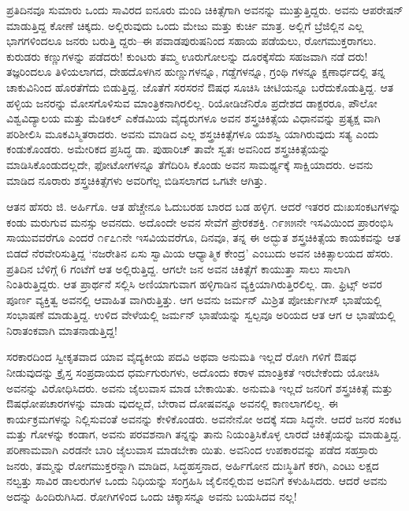 ಪ್ರತಿದಿನವೂ ಸುಮಾರು ಒಂದು ಸಾವಿರದ ಐನೂರು ಮಂದಿ ಚಿಕಿತ್ಸೆಗಾಗಿ ಅವನನ್ನು ಮುತ್ತುತ್ತಿದ್ದರು. ಅವನು ಆಪರೇಷನ್ ಮಾಡುತ್ತಿದ್ದ ಕೋಣೆ ಚಿಕ್ಕದು. ಅಲ್ಲಿರುವುದು ಒಂದು ಮೇಜು ಮತ್ತು ಕುರ್ಚಿ ಮಾತ್ರ. ಅಲ್ಲಿಗೆ ಬ್ರೆಜಿಲ್ಲಿನ ಎಲ್ಲ ಭಾಗಗಳಿಂದಲೂ ಜನರು ಬರುತ್ತಿ ದ್ದರು–ಈ ಪವಾಡಪುರುಷನಿಂದ ಸಹಾಯ ಪಡೆಯಲು, ರೋಗಮುಕ್ತರಾಗಲು. ಕುರುಡರು ಕಣ್ಣುಗಳನ್ನು ಪಡೆದರು! ಕುಂಟರು ತಮ್ಮ ಊರುಗೋಲನ್ನು ದೂರಕ್ಕೆಸೆದು ಸಹಜವಾಗಿ ನಡೆ ದರು! ತಜ್ಞರಿಂದಲೂ ತಿಳಿಯಲಾಗದ, ದೇಹದೊಳಗಿನ ಹುಣ್ಣುಗಳನ್ನೂ, ಗಡ್ಡೆಗಳನ್ನೂ, ಗ್ರಂಥಿ ಗಳನ್ನೂ ಕ್ಷಣಾರ್ಧದಲ್ಲಿ ತನ್ನ ಚಾಕುವಿನಿಂದ ಹೊರತೆಗೆದು ಬಿಡುತ್ತಿದ್ದ. ಜೊತೆಗೆ ಸರಸರನೆ ಔಷಧ ಸೂಚಿಸಿ ಚೀಟಿಯನ್ನೂ ಬರೆದುಕೊಡುತ್ತಿದ್ದ. ಆತ ಹಳ್ಳಿಯ ಜನರನ್ನು ಮೋಸಗೊಳಿಸುವ ಮಾಂತ್ರಿಕನಾಗಿರಲಿಲ್ಲ. ರಿಯೋಡಿಜೆನಿರೊ ಪ್ರದೇಶದ ಡಾಕ್ಟರರೂ, ಪೌಲೋ ವಿಶ್ವವಿದ್ಯಾಲಯ ಮತ್ತು ಮೆಡಿಕಲ್ ಎಕೆಡಮಿಯ ವೈದ್ಯರುಗಳೂ ಅವನ ಶಸ್ತ್ರಚಿಕಿತ್ಸೆಯ ವಿಧಾನವನ್ನು ಪ್ರತ್ಯಕ್ಷ ವಾಗಿ ಪರಿಶೀಲಿಸಿ ಮೂಕವಿಸ್ಮಿತರಾದರು. ಅವನು ಮಾಡಿದ ಎಲ್ಲ ಶಸ್ತ್ರಚಿಕಿತ್ಸೆಗಳೂ ಯಶಸ್ವಿ ಯಾಗಿರುವುದು ಸತ್ಯ ಎಂದು ಕಂಡುಕೊಂಡರು. ಅಮೇರಿಕದ ಪ್ರಸಿದ್ಧ ಡಾ. ಪುಹಾರಿಚ್ ತಾವೇ ಸ್ವತಃ ಅವನಿಂದ ಶಸ್ತ್ರಚಿಕಿತ್ಸೆಯನ್ನು ಮಾಡಿಸಿಕೊಂಡುದಲ್ಲದೇ, ಫೋಟೋಗಳನ್ನೂ ತೆಗೆದಿರಿಸಿ ಕೊಂಡು ಅವನ ಸಾಮರ್ಥ್ಯಕ್ಕೆ ಸಾಕ್ಷಿಯಾದರು. ಅವನು ಮಾಡಿದ ನೂರಾರು ಶಸ್ತ್ರಚಿಕಿತ್ಸೆಗಳು ಅವರಿಗೆಲ್ಲ ಬಿಡಿಸಲಾಗದ ಒಗಟೇ ಆಗಿತ್ತು.

ಆತನ ಹೆಸರು ಜಿ. ಅರ್ಹಿಗೊ. ಆತ ಹೆಚ್ಚೇನೂ ಓದುಬರಹ ಬಾರದ ಬಡ ಹಳ್ಳಿಗ. ಆದರೆ ಇತರರ ದುಃಖಸಂಕಟಗಳನ್ನು ಕಂಡು ಮರುಗುವ ಮನಸ್ಸು ಅವನದು. ಅದೊಂದೇ ಅವನ ಸೇವೆಗೆ ಪ್ರೇರಕಶಕ್ತಿ. ೧೯೫೫ನೇ ಇಸವಿಯಿಂದ ಪ್ರಾರಂಭಿಸಿ ಸಾಯುವವರೆಗೂ ಎಂದರೆ ೧೯೭೧ನೇ ಇಸವಿಯವರೆಗೂ, ದಿನವೂ, ತನ್ನ ಈ ಅದ್ಭುತ ಶಸ್ತ್ರಚಿಕಿತ್ಸೆಯ ಕಾಯಕವನ್ನು ಆತ ಬಿಡದೆ ನೆರವೇರಿಸುತ್ತಿದ್ದ ‘ನಜರೇತಿನ ಏಸು ಸ್ವಾಮಿಯ ಆಧ್ಯಾತ್ಮಿಕ ಕೇಂದ್ರ’ ಎಂಬುದು ಅವನ ಚಿಕಿತ್ಸಾಲಯದ ಹೆಸರು. ಪ್ರತಿದಿನ ಬೆಳಿಗ್ಗೆ 6 ಗಂಟೆಗೆ ಆತ ಅಲ್ಲಿರುತ್ತಿದ್ದ. ಆಗಲೇ ಜನ ಅವನ ಚಿಕಿತ್ಸೆಗೆ ಕಾಯುತ್ತಾ ಸಾಲು ಸಾಲಾಗಿ ನಿಂತಿರುತ್ತಿದ್ದರು. ಆತ ಪ್ರಾರ್ಥನೆ ಸಲ್ಲಿಸಿ ಅಣಿಯಾಗುವಾಗ ಹಳ್ಳಿಗಾಡಿನ ವ್ಯಕ್ತಿಯಾಗಿರುತ್ತಿರಲಿಲ್ಲ. ಡಾ. ಫ್ರಿಟ್ಸ್ ಅವರ ಪೂರ್ಣ ವ್ಯಕ್ತಿತ್ವ ಅವನಲ್ಲಿ ಆವಾಹಿತ ವಾಗಿರುತ್ತಿತ್ತು. ಆಗ ಅವನು ಜರ್ಮನ್ ಮಿಶ್ರಿತ ಪೋರ್ಚುಗೀಸ್ ಭಾಷೆಯಲ್ಲಿ ಸಂಭಾಷಣೆ ಮಾಡುತ್ತಿದ್ದ. ಉಳಿದ ವೇಳೆಯಲ್ಲಿ ಜರ್ಮನ್ ಭಾಷೆಯನ್ನು ಸ್ವಲ್ಪವೂ ಅರಿಯದ ಆತ ಆಗ ಆ ಭಾಷೆಯಲ್ಲಿ ನಿರಾತಂಕವಾಗಿ ಮಾತನಾಡುತ್ತಿದ್ದ!

ಸರಕಾರದಿಂದ ಸ್ವೀಕೃತವಾದ ಯಾವ ವೈದ್ಯಕೀಯ ಪದವಿ ಅಥವಾ ಅನುಮತಿ ಇಲ್ಲದೆ ರೋಗಿ ಗಳಿಗೆ ಔಷಧ ನೀಡುವುದನ್ನು ಕ್ರೈಸ್ತ ಸಂಪ್ರದಾಯದ ಧರ್ಮಗುರುಗಳು, ಅದೊಂದು ಕರಾಳ ಮಾಂತ್ರಿಕತೆ ಇರಬೇಕೆಂದು ಯೋಚಿಸಿ ಅವನನ್ನು ವಿರೋಧಿಸಿದರು. ಅವನು ಜೈಲುವಾಸ ಮಾಡ ಬೇಕಾಯಿತು. ಅನುಮತಿ ಇಲ್ಲದೆ ಜನರಿಗೆ ಶಸ್ತ್ರಚಿಕಿತ್ಸೆ ಮತ್ತು ಔಷಧೋಪಚಾರಗಳನ್ನು ಮಾಡು ವುದಲ್ಲದೆ, ಬೇರಾವ ದೋಷವನ್ನೂ ಅವನಲ್ಲಿ ಕಾಣಲಾಗಲಿಲ್ಲ. ಈ ಕಾರ್ಯಕ್ರಮಗಳನ್ನು ನಿಲ್ಲಿಸುವಂತೆ ಅವನನ್ನು ಕೇಳಿಕೊಂಡರು. ಅವನೇನೋ ಅದಕ್ಕೆ ಸದಾ ಸಿದ್ಧನೇ. ಆದರೆ ಜನರ ಸಂಕಟ ಮತ್ತು ಗೋಳನ್ನು ಕಂಡಾಗ, ಅವನು ಪರವಶನಾಗಿ ತನ್ನನ್ನು ತಾನು ನಿಯಂತ್ರಿಸಿಕೊಳ್ಳ ಲಾರದೆ ಚಿಕಿತ್ಸೆಯನ್ನು ಮಾಡುತ್ತಿದ್ದ. ಪರಿಣಾಮವಾಗಿ ಎರಡನೇ ಬಾರಿ ಜೈಲುವಾಸ ಮಾಡಬೇಕಾ ಯಿತು. ಅವನಿಂದ ಉಪಕಾರವನ್ನು ಪಡೆದ ಸಹಸ್ರಾರು ಜನರು, ತಮ್ಮನ್ನು ರೋಗಮುಕ್ತರನ್ನಾಗಿ ಮಾಡಿದ, ಸಿದ್ಧಹಸ್ತನಾದ, ಅರ್ಹಿಗೋನ ದುಃಸ್ಥಿತಿಗೆ ಕರಗಿ, ಎಂಟು ಲಕ್ಷದ ನಲ್ವತ್ತು ಸಾವಿರ ಡಾಲರುಗಳ ಒಂದು ನಿಧಿಯನ್ನು ಸಂಗ್ರಹಿಸಿ ಜೈಲಿನಲ್ಲಿರುವ ಅವನಿಗೆ ಕಳುಹಿಸಿದರು. ಆದರೆ ಅವನು ಅದನ್ನು ಹಿಂದಿರುಗಿಸಿದ. ರೋಗಿಗಳಿಂದ ಒಂದು ಚಿಕ್ಕಾಸನ್ನೂ ಅವನು ಬಯಸಿದವ ನಲ್ಲ!

